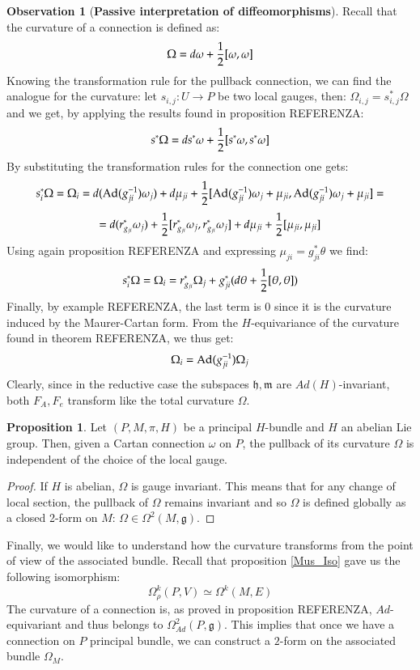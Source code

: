 \documentclass[12pt,a4paper]{report}
\theoremstyle{definition}
\theoremstyle{Theorem}
\newtheorem{Prop}[Def]{Proposition}
\theoremstyle{break}
\theoremstyle{definition}
\newtheorem{Obs}[Def]{Observation}
\begin{document}
	\begin{Obs}[\textbf{Passive interpretation of diffeomorphisms}]
		Recall that the curvature of a connection is defined as:
		$$\Omega=d\omega+{1\over 2}[\omega,\omega]$$
		Knowing the transformation rule for the pullback connection, we can find the analogue for the curvature: let $s_{i,j}:U\rightarrow P$ be two local gauges, then: $\Omega_{i,j}=s_{i,j}^*\Omega$ and we get, by applying the results found in proposition REFERENZA:
		$$s^*\Omega=ds^*\omega+{1\over 2}[s^*\omega,s^*\omega]$$
		By substituting the transformation rules for the connection one gets:
		$$s_i^*\Omega=\Omega_i=d(\hbox{Ad}(g_{ji}^{-1})\omega_j)+d\mu_{ji}+{1\over 2}[\hbox{Ad}(g_{ji}^{-1})\omega_j+\mu_{ji},\hbox{Ad}(g_{ji}^{-1})\omega_j+\mu_{ji}]=$$
		$$=d(r^*_{g_{ji}}\omega_j)+{1\over 2}[r^*_{g_{ji}}\omega_j,r^*_{g_{ji}}\omega_j]+d\mu_{ji}+{1\over 2}[\mu_{ji},\mu_{ji}]$$
		Using again proposition REFERENZA and expressing $\mu_{ji}=g_{ji}^*\theta$ we find:
		$$s_i^*\Omega=\Omega_i=r^*_{g_{ji}}\Omega_j+g_{ji}^*(d\theta+{1\over 2}[\theta,\theta])$$
		Finally, by example REFERENZA, the last term is 0 since it is the curvature induced by the Maurer-Cartan form. From the $H$-equivariance of the curvature found in theorem REFERENZA, we thus get:
		$$\Omega_i=\hbox{Ad}(g_{ji}^{-1})\Omega_j$$
		Clearly, since in the reductive case the subspaces $\mathfrak{h},\mathfrak{m}$ are $Ad(H)$-invariant, both $F_A,F_e$ transform like the total curvature $\Omega$.
	\end{Obs}
	\begin{Prop}
		Let $(P,M,\pi,H)$ be a principal $H$-bundle and $H$ an abelian Lie group. Then, given a Cartan connection $\omega$ on $P$, the pullback of its curvature $\Omega$ is independent of the choice of the local gauge.
	\end{Prop}
	\begin{proof}
		If $H$ is abelian, $\Omega$ is gauge invariant. This means that for any change of local section, the pullback of $\Omega$ remains invariant and so $\Omega$ is defined globally as a closed 2-form on $M$: $\Omega\in \Omega^2(M,\mathfrak{g})$.
	\end{proof}
	Finally, we would like to understand how the curvature transforms from the point of view of the associated bundle. Recall that proposition \ref{Mus_Iso} gave us the following isomorphism:
	$$\Omega^k_\rho(P,V)\simeq \Omega^k(M,E)$$
	The curvature of a connection is, as proved in proposition REFERENZA, $Ad$-equivariant and thus belongs to $\Omega^2_{Ad}(P,\mathfrak{g})$. This implies that once we have a connection on $P$ principal bundle, we can construct a $2$-form on the associated bundle $\Omega_M$.
\end{document}
